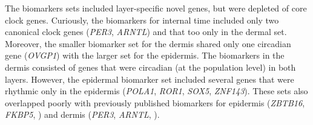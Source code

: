 The biomarkers sets included layer-specific novel genes, but were depleted of core clock genes. Curiously, the biomarkers for internal time included only two canonical clock genes (\textit{PER3}, \textit{ARNTL}) and that too only in the dermal set. Moreover, the smaller biomarker set for the dermis shared only one circadian gene (\textit{OVGP1}) with the larger set for the epidermis. The biomarkers in the dermis consisted of genes that were circadian (at the population level) in both layers. However, the epidermal biomarker set included several genes that were rhythmic only in the epidermis (\textit{POLA1}, \textit{ROR1}, \textit{SOX5}, \textit{ZNF143}). These sets also overlapped poorly with previously published biomarkers for epidermis (\textit{ZBTB16}, \textit{FKBP5}, \cite{Wu2018}) and dermis (\textit{PER3}, \textit{ARNTL}, \cite{Wu2020}). 





